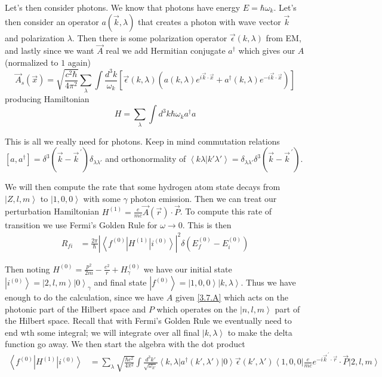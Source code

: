 \documentclass[10pt]{report}
\newcommand{\bra}[1]{\left<#1\right|}
\newcommand{\ket}[1]{\left|#1\right>}
\newcommand{\dotp}[2]{\left<#1\left.\right|#2\right>}
\newcommand{\abs}[1]{\left|#1\right|}
\newcommand{\pvec}[1]{\vec{#1}^{\,\prime}}
\begin{document}
Let's then consider photons. We know that photons have energy $E = \hbar \omega_k$. Let's then consider an operator $a(\vec{k},\lambda)$ that creates a photon with wave vector $\vec{k}$ and polarization $\lambda$. Then there is some polarization operator $\vec{\epsilon}(k,\lambda)$ from EM, and lastly since we want $\vec{A}$ real we add Hermitian conjugate $a^\dagger$ which gives our $A$ (normalized to $1$ again)
\begin{equation}
    \vec{A}_s(\vec{x}) = \sqrt{\frac{c^2\hbar}{4\pi^2}}\sum_{\lambda}^{}\int \frac{d^3k}{\omega_k} \left[ \vec{\epsilon}(k,\lambda)\left(a(k,\lambda)e^{i\vec{k}\cdot \vec{x}} + a^\dagger(k,\lambda)e^{-i\vec{k}\cdot \vec{x}}\right)  \right]\label{3.7.A}
\end{equation}
producing Hamiltonian
\begin{equation}
    H = \sum_{\lambda}^{}\int d^3k \hbar\omega_k a^\dagger a
\end{equation}

This is all we really need for photons. Keep in mind commutation relations $\left[ a, a^\dagger \right] = \delta^3(\vec{k} - \pvec{k})\delta_{\lambda \lambda'}$ and orthonormality of $\dotp{k\lambda}{k'\lambda'} = \delta_{\lambda\lambda'}\delta^3(\vec{k}-\pvec{k})$.

We will then compute the rate that some hydrogen atom state decays from $\ket{Z,l,m}$ to $\ket{1,0,0}$ with some $\gamma$ photon emission. Then we can treat our perturbation Hamiltonian $H^{(1)} = \frac{e}{mc}\vec{A}(\vec{r})\cdot \vec{P}$. To compute this rate of transition we use Fermi's Golden Rule for $\omega \to 0$. This is then
\begin{align}
    R_{fi} &= \frac{2\pi}{\hbar}\abs{\bra{f^{(0)}}H^{(1)}\ket{i^{(0)}}}^2\delta\left( E_f^{(0)} - E_i^{(0)} \right)
\end{align}

Then noting $H^{(0)} = \frac{p^2}{2m} - \frac{e^2}{r} + H_\gamma^{(0)}$ we have our initial state $\ket{i^{(0)}} = \ket{2,l,m}\ket{0}_\gamma$ and final state $\ket{f^{(0)}} = \ket{1,0,0}\ket{k, \lambda}$. Thus we have enough to do the calculation, since we have $A$ given \eqref{3.7.A} which acts on the photonic part of the Hilbert space and $P$ which operates on the $\ket{n,l,m}$ part of the Hilbert space. Recall that with Fermi's Golden Rule we eventually need to end wth some integral; we will integrate over all final $\ket{k,\lambda}$ to make the delta function go away. We then start the algebra with the dot product
\begin{align}
    \bra{f^{(0)}}H^{(1)}\ket{i^{(0)}} &= \sum_{\lambda}^{}\sqrt{\frac{\hbar c^2}{4\pi^2}}\int \frac{d^3k'}{\sqrt{\omega_{k'}}}\bra{k,\lambda}a^\dagger(k',\lambda')\ket{0}\vec{\epsilon}(k',\lambda') \bra{1,0,0}\frac{e}{mc}e^{-i\pvec{k}\cdot \vec{r}}\cdot \vec{P}\ket{2,l,m}
\end{align}
\end{document}
